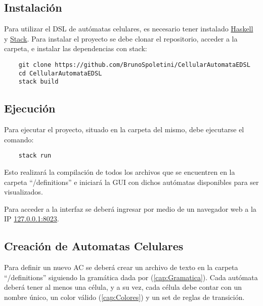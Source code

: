 \documentclass[fleqn,a4paper,11pt]{article}
\theoremstyle{mytheor}
\begin{document}
    \subsection{Instalación}
    Para utilizar el DSL de autómatas celulares, es necesario tener instalado \href{https://www.haskell.org/}{Haskell} y \href{https://docs.haskellstack.org/en/stable/}{Stack}.
    Para instalar el proyecto se debe clonar el repositorio, acceder a la carpeta, e instalar las dependencias con stack:
    
    \begin{verbatim}
    git clone https://github.com/BrunoSpoletini/CellularAutomataEDSL
    cd CellularAutomataEDSL
    stack build
    \end{verbatim}
    \vspace{-1cm}
    
    \subsection{Ejecución}
    Para ejecutar el proyecto, situado en la carpeta del mismo, debe ejecutarse el comando:
    \begin{verbatim}
    stack run
    \end{verbatim}
    \vspace{-0.5cm}
    
    Esto realizará la compilación de todos los archivos que se encuentren en la carpeta ``/definitions'' e iniciará la GUI con dichos autómatas disponibles para ser visualizados.
    
    Para acceder a la interfaz se deberá ingresar por medio de un navegador web a la IP \href{http://127.0.0.1:8023}{127.0.0.1:8023}.
    


    \subsection{Creación de Automatas Celulares}
    Para definir un nuevo AC se deberá crear un archivo de texto en la carpeta ``/definitions'' siguiendo la gramática dada por (\ref{cap:Gramatica}). Cada autómata deberá tener al menos una célula, y a su vez, cada célula debe contar con un nombre único, un color válido (\ref{cap:Colores}) y un set de reglas de transición. 
\end{document}
